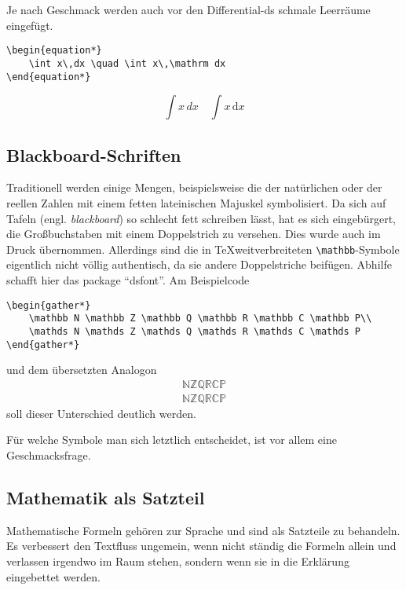 Je nach Geschmack werden auch vor den Differential-ds schmale Leerräume eingefügt.
\begin{lstlisting}
\begin{equation*}
	\int x\,dx \quad \int x\,\mathrm dx
\end{equation*}
\end{lstlisting}

\begin{equation*}
	\int x\,dx \quad \int x\,\mathrm dx
\end{equation*}

\subsection{Blackboard-Schriften}
Traditionell werden einige Mengen, beispielsweise die der natürlichen oder der reellen Zahlen mit einem fetten lateinischen Majuskel symbolisiert. Da sich auf Tafeln (engl. \emph{blackboard}) so schlecht fett schreiben lässt, hat es sich eingebürgert, die Großbuchstaben mit einem Doppelstrich zu versehen. Dies wurde auch im Druck übernommen. Allerdings sind die in \TeX weitverbreiteten \verb|\mathbb|-Symbole eigentlich nicht völlig authentisch, da sie andere Doppelstriche beifügen. Abhilfe schafft hier das package \enquote{dsfont}. Am Beispielcode
\begin{lstlisting}
\begin{gather*}
	\mathbb N \mathbb Z \mathbb Q \mathbb R \mathbb C \mathbb P\\
	\mathds N \mathds Z \mathds Q \mathds R \mathds C \mathds P
\end{gather*}
\end{lstlisting}
und dem übersetzten Analogon
\begin{gather*}
	\mathbb N \mathbb Z \mathbb Q \mathbb R \mathbb C \mathbb P\\
	\mathds N \mathds Z \mathds Q \mathds R \mathds C \mathds P
\end{gather*}
soll dieser Unterschied deutlich werden.

Für welche Symbole man sich letztlich entscheidet, ist vor allem eine Geschmacksfrage.

\subsection{Mathematik als Satzteil}
Mathematische Formeln gehören zur Sprache und sind als Satzteile zu behandeln. Es verbessert den Textfluss ungemein, wenn nicht ständig die Formeln allein und verlassen irgendwo im Raum stehen, sondern wenn sie in die Erklärung eingebettet werden.

